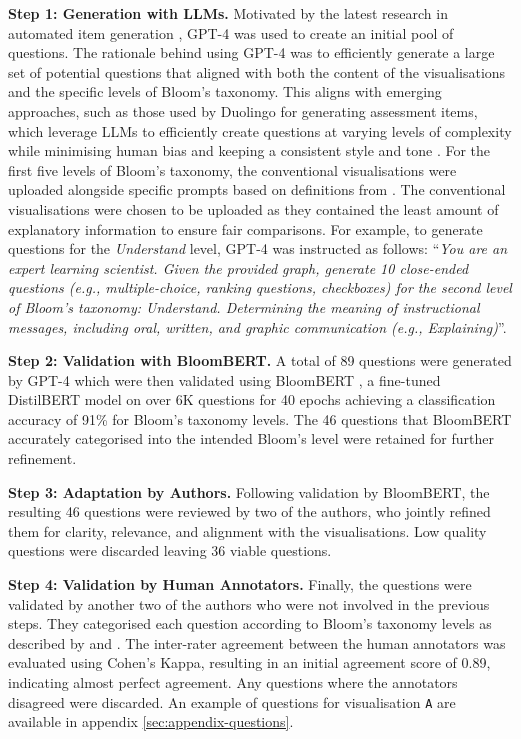 \noindent \textbf{Step 1: Generation with LLMs.} Motivated by the latest research in automated item generation \cite{hao2024transforming, attali2022interactive, zu2023automated}, GPT-4 was used to create an initial pool of questions. The rationale behind using GPT-4 was to efficiently generate a large set of potential questions that aligned with both the content of the visualisations and the specific levels of Bloom's taxonomy. This aligns with emerging approaches, such as those used by Duolingo for generating assessment items, which leverage LLMs to efficiently create questions at varying levels of complexity while minimising human bias and keeping a consistent style and tone \cite{attali2022interactive}. For the first five levels of Bloom's taxonomy, the conventional visualisations were uploaded alongside specific prompts based on definitions from \citet{krathwohl2002revision}. The conventional visualisations were chosen to be uploaded as they contained the least amount of explanatory information to ensure fair comparisons. For example, to generate questions for the \textit{Understand} level, GPT-4 was instructed as follows: ``\textit{You are an expert learning scientist. Given the provided graph, generate 10 close-ended questions (e.g., multiple-choice, ranking questions, checkboxes) for the second level of Bloom's taxonomy: Understand. Determining the meaning of instructional messages, including oral, written, and graphic communication (e.g., Explaining)}''. 
    

\noindent \textbf{Step 2: Validation with BloomBERT.}
A total of 89 questions were generated by GPT-4 which were then validated using BloomBERT \cite{BloomBERT}, a fine-tuned DistilBERT model on over 6K questions for 40 epochs achieving a classification accuracy of 91\% for Bloom's taxonomy levels. The 46 questions that BloomBERT accurately categorised into the intended Bloom's level were retained for further refinement. 

\noindent \textbf{Step 3: Adaptation by Authors.}
Following validation by BloomBERT, the resulting 46 questions were reviewed by two of the authors, who jointly refined them for clarity, relevance, and alignment with the visualisations. Low quality questions were discarded leaving 36 viable questions.

\noindent \textbf{Step 4: Validation by Human Annotators.}
Finally, the questions were validated by another two of the authors who were not involved in the previous steps. They categorised each question according to Bloom's taxonomy levels as described by \citet{burns2020evaluate} and \citet{krathwohl2002revision}. The inter-rater agreement between the human annotators was evaluated using Cohen’s Kappa, resulting in an initial agreement score of 0.89, indicating almost perfect agreement. Any questions where the annotators disagreed were discarded. An example of questions for visualisation \texttt{A} are available in appendix \ref{sec:appendix-questions}. 


